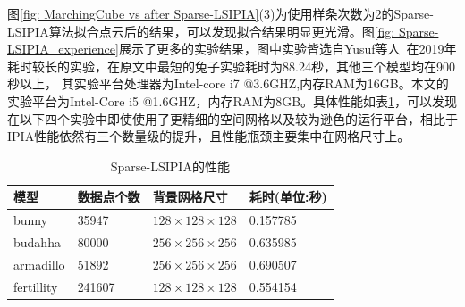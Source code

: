 图\ref{fig: MarchingCube vs after Sparse-LSIPIA}(3)为使用样条次数为2的Sparse-LSIPIA算法拟合点云后的结果，可以发现拟合结果明显更光滑。图\ref{fig: Sparse-LSIPIA_experience}展示了更多的实验结果，图中实验皆选自Yusuf等人~\cite{hamza2020implicit}在2019年耗时较长的实验，在原文中最短的兔子实验耗时为88.24秒，其他三个模型均在900秒以上，
其实验平台处理器为Intel-core i7 @3.6GHZ,内存RAM为16GB。本文的实验平台为Intel-Core i5 @1.6GHZ，内存RAM为8GB。具体性能如表\ref{tab:Sparse-LSIPIA perfomance}，可以发现在以下四个实验中即使使用了更精细的空间网格以及较为逊色的运行平台，相比于IPIA性能依然有三个数量级的提升，且性能瓶颈主要集中在网格尺寸上。
\begin{table}[htb]
    \centering
    \caption{Sparse-LSIPIA的性能}
    \label{tab:Sparse-LSIPIA perfomance}
      \begin{tabular}{llll}
        \toprule
        模型 & 数据点个数 & 背景网格尺寸& 耗时(单位:秒)\\
        \midrule
        bunny & 35947& $128\times 128\times 128$ &  0.157785\\
        budahha & 80000& $256\times 256\times 256$&  0.635985  \\
        armadillo & 51892& $256\times 256\times 256$& 0.690507 \\
        fertillity & 241607& $128\times 128\times 128$&0.554154 \\
        \bottomrule
      \end{tabular}
\end{table}
